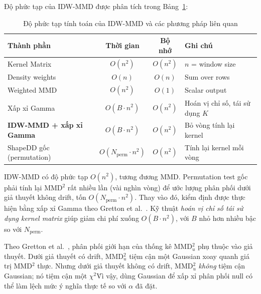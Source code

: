 Độ phức tạp của IDW-MMD được phân tích trong Bảng~\ref{tab:complexity}:

\begin{table}[H]
	\centering
	\caption{Độ phức tạp tính toán của IDW-MMD và các phương pháp liên quan}
	\label{tab:complexity}
	\begin{tabular}{|l|c|c|l|}
		\hline
		\textbf{Thành phần}     & \textbf{Thời gian}   & \textbf{Bộ nhớ} & \textbf{Ghi chú}    \\
		\hline
		Kernel Matrix           & $O(n^2)$             & $O(n^2)$        & $n$ = window size   \\
		Density weights         & $O(n)$               & $O(n)$          & Sum over rows       \\
		Weighted MMD            & $O(n^2)$             & $O(1)$          & Scalar output       \\
		Xấp xỉ Gamma            & $O(B \cdot n^2)$     & $O(n^2)$        & Hoán vị chỉ số, tái sử dụng $K$ \\
		\hline
		\textbf{IDW-MMD + xấp xỉ Gamma} & $O(B \cdot n^2)$ & $O(n^2)$        & Bỏ vòng tính lại kernel \\
		\hline
		ShapeDD gốc (permutation) & $O(N_{\text{perm}} \cdot n^2)$ & $O(n^2)$  & Tính lại kernel mỗi vòng \\
		\hline
	\end{tabular}
\end{table}

IDW-MMD có độ phức tạp $O(n^2)$, tương đương MMD. Permutation test gốc phải tính lại MMD$^2$ rất nhiều lần (vài nghìn vòng) để ước lượng phân phối dưới giả thuyết không drift, tốn $O(N_{\text{perm}} \cdot n^2)$. Thay vào đó, kiểm định được thực hiện bằng xấp xỉ Gamma theo Gretton et al.~\cite{gretton2009gamma}. Kỹ thuật \textit{hoán vị chỉ số tái sử dụng kernel matrix} giúp giảm chi phí xuống $O(B \cdot n^2)$, với $B$ nhỏ hơn nhiều bậc so với $N_{\text{perm}}$.
 
Theo Gretton et al.~\cite{gretton2012kernel}, phân phối giới hạn của thống kê MMD$^2_u$ phụ thuộc vào giả thuyết. Dưới giả thuyết có drift, MMD$^2_u$ tiệm cận một Gaussian xoay quanh giá trị MMD$^2$ thực. Nhưng dưới giả thuyết không có drift, MMD$^2_u$ \textit{không} tiệm cận Gaussian; nó tiệm cận một $\chi^2$\. Vì vậy, dùng Gaussian để xấp xỉ phân phối null có thể làm lệch mức ý nghĩa thực tế so với $\alpha$ đã đặt.

